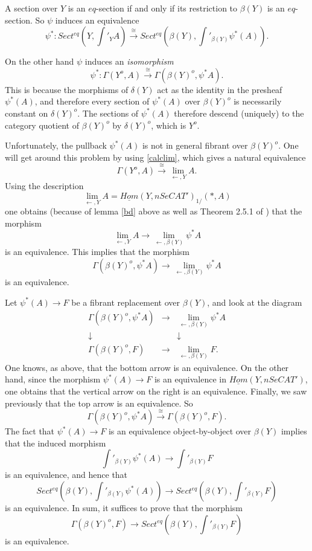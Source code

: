 A section over $Y$ is an $eq$-section if and only if its restriction to
$\beta (Y)$ is an $eq$-section. So $\psi$ induces an equivalence
$$
\psi ^{\ast}: Sect ^{eq}(Y, \int '_YA)\stackrel{\cong}{\rightarrow}
Sect ^{eq}(\beta (Y), \int '_{\beta (Y)}\psi ^{\ast}(A)).
$$

On the other hand $\psi$ induces an {\em isomorphism}
$$
\psi ^{\ast}: \Gamma (Y^o,A) \stackrel{\cong}{\rightarrow}\Gamma (\beta (Y) ^o,
\psi ^{\ast}A).
$$
This is because the morphisms of $\delta (Y)$ act as the identity in the
presheaf $\psi ^{\ast}(A)$, and therefore every section of
$\psi ^{\ast}(A)$ over $\beta (Y)^o$ is necessarily constant on $\delta
(Y)^o$.
The sections of $\psi ^{\ast}(A)$ therefore descend (uniquely) to the
category
quotient of $\beta (Y)^o$ by $\delta (Y)^o$, which is $Y^o$.

Unfortunately, the pullback $\psi ^{\ast}(A)$ is not in general
fibrant
over $\beta (Y)^o$. One will get around this problem by using \ref{calclim},
which gives a natural equivalence
$$
\Gamma (Y^o, A)\stackrel{\cong}{\rightarrow}
\lim _{\leftarrow , Y} A.
$$
Using the description
$$
\lim _{\leftarrow , Y} A= \underline{Hom}(Y, nSeCAT')_{1/}(\ast , A)
$$
one obtains (because of lemma \ref{bd} above as well as Theorem 2.5.1
of \cite{limits}) that the morphism
$$
\lim _{\leftarrow , Y} A\rightarrow \lim _{\leftarrow , \beta (Y)} \psi ^{\ast}A
$$
is an equivalence. This implies that the morphism
$$
\Gamma (\beta (Y)^o, \psi ^{\ast} A) \rightarrow
\lim _{\leftarrow , \beta (Y)} \psi ^{\ast}A
$$
is an equivalence.

Let $\psi ^{\ast} (A) \rightarrow F$ be a fibrant replacement over
$\beta (Y)$, and look at the diagram
$$
\begin{array}{ccc}
\Gamma (\beta (Y)^o, \psi ^{\ast} A) &\rightarrow &
\lim _{\leftarrow , \beta (Y)} \psi ^{\ast}A \\
\downarrow && \downarrow \\
\Gamma (\beta (Y)^o, F)&\rightarrow &
\lim _{\leftarrow , \beta (Y)}F.
\end{array}
$$
One knows, as above, that the bottom arrow is an equivalence.
On the other hand, since the morphism $\psi ^{\ast} (A) \rightarrow F$
is an equivalence in $\underline{Hom}(Y, nSeCAT')$, one obtains that
the vertical arrow on the right is an equivalence. Finally, we saw
previously that the top arrow is an equivalence. So
$$
\Gamma (\beta (Y)^o, \psi ^{\ast} A)
\stackrel{\cong}{\rightarrow}
\Gamma (\beta (Y)^o, F).
$$
The fact that $\psi ^{\ast} (A) \rightarrow F$ is an equivalence
object-by-object over $\beta (Y)$ implies that the induced morphism
$$
\int '_{\beta (Y)}\psi ^{\ast}(A) \rightarrow
\int '_{\beta (Y)}F
$$
is an equivalence, and hence that
$$
Sect ^{eq}(\beta (Y), \int '_{\beta (Y)}\psi ^{\ast}(A) )
\rightarrow
Sect ^{eq}(\beta (Y), \int '_{\beta (Y)}F )
$$
is an equivalence. In sum, it suffices to prove that the morphism
$$
\Gamma (\beta (Y)^o, F)\rightarrow Sect ^{eq}(\beta (Y), \int '_{\beta (Y)}F )
$$
is an equivalence.

